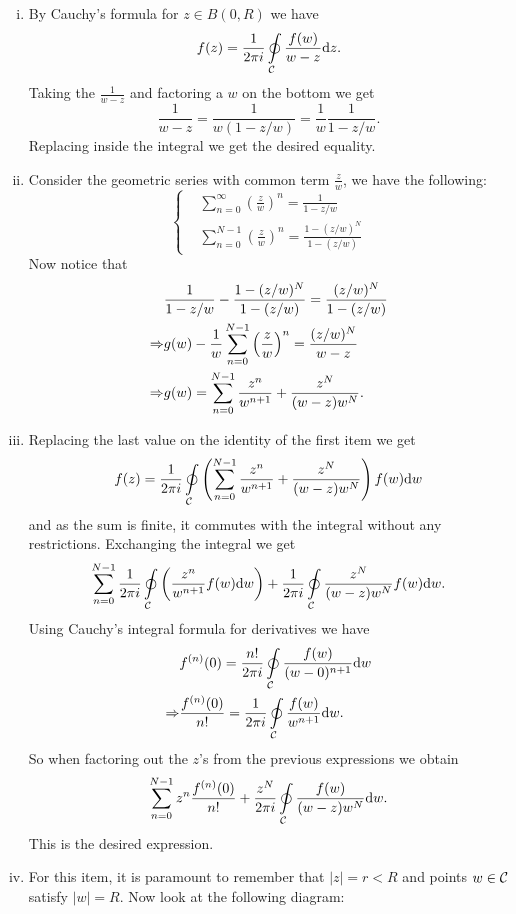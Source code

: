 \documentclass[12pt]{memoir}
\begin{document}
\begin{ptcbr}
    \begin{enumerate}[i)]
        \itemsep=-0.4em
        \item By Cauchy's formula for $z\in B(0,R)$ we have 
        $$f(z)=\frac{1}{2\pi i}\oint\limits_{\mathcal{C}}\frac{f(w)}{w-z}\dd z.$$
        Taking the $\frac{1}{w-z}$ and factoring a $w$ on the bottom we get 
        $$\frac{1}{w-z}=\frac{1}{w(1-z/w)}=\frac{1}{w}\frac{1}{1-z/w}.$$
        Replacing inside the integral we get the desired equality. 
        \item Consider the geometric series with common term $\frac{z}{w}$, we have the following:
        $$
        \left\lbrace
        \begin{aligned}
            &\sum_{n=0}^\infty \left(\frac
            {z}{w}\right)^n=\frac{1}{1-z/w}\\
            &\sum_{n=0}^{N-1} \left(\frac
            {z}{w}\right)^n=\frac{1-(z/w)^N}{1-(z/w)}
        \end{aligned}
        \right.
        $$
        Now notice that 
        \begin{align*}
            &\frac{1}{1-z/w}-\frac{1-(z/w)^N}{1-(z/w)}=\frac{(z/w)^N}{1-(z/w)}\\
            \Rightarrow&g(w)-\frac{1}{w}\sum_{n=0}^{N-1} \left(\frac
            {z}{w}\right)^n=\frac{(z/w)^N}{w-z}\\
            \Rightarrow&g(w)=\sum_{n=0}^{N-1}\frac{z^n}{w^{n+1}}+\frac{z^N}{(w-z)w^N}.
        \end{align*}
        \item Replacing the last value on the identity of the first item we get 
        $$f(z)=\frac{1}{2\pi i}\oint\limits_{\mathcal{C}} \left(\sum_{n=0}^{N-1}\frac{z^n}{w^{n+1}}+\frac{z^N}{(w-z)w^N}\right)f(w)\dd w$$
        and as the sum is finite, it commutes with the integral without any restrictions. Exchanging the integral we get 
        $$\sum_{n=0}^{N-1}\frac{1}{2\pi i}\oint\limits_{\mathcal{C}} \left(\frac{z^n}{w^{n+1}}f(w)\dd w\right)+\frac{1}{2\pi i}\oint\limits_{\mathcal{C}} \frac{z^N}{(w-z)w^N}f(w)\dd w.$$
        Using Cauchy's integral formula for derivatives we have 
        \begin{align*}
        &f^{(n)}(0)=\frac{n!}{2\pi i}\oint\limits_{\mathcal{C}}\frac{f(w)}{(w-0)^{n+1}}\dd w\\
        \Rightarrow&\frac{f^{(n)}(0)}{n!}=\frac{1}{2\pi i}\oint\limits_{\mathcal{C}}\frac{f(w)}{w^{n+1}}\dd w.
        \end{align*}
        So when factoring out the $z$'s from the previous expressions we obtain 
        $$\sum_{n=0}^{N-1}z^n\frac{f^{(n)}(0)}{n!}+\frac{z^N}{2\pi i}\oint\limits_{\mathcal{C}} \frac{f(w)}{(w-z)w^N}\dd w.$$
        This is the desired expression. 
        \item For this item, it is paramount to remember that $|z|=r<R$ and points $w\in\mathcal{C}$ satisfy $|w|=R$. Now look at the following diagram: 
        \begin{center}





\end{center}
\end{enumerate}
\end{ptcbr}
\end{document}
